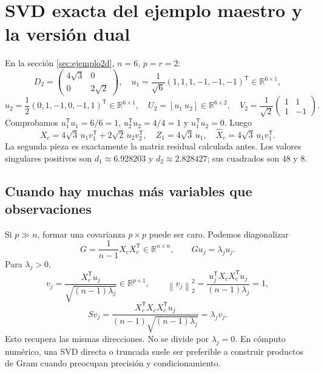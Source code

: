 \documentclass[11pt,a4paper]{article}
\newcommand{\R}{\mathbb R}
\newcommand{\T}{^{\mathsf T}}
\newcommand{\norm}[1]{\left\lVert #1\right\rVert}
\theoremstyle{definition}
\begin{document}
\section{SVD exacta del ejemplo maestro y la versión dual}
En la sección \ref{sec:ejemplo2d}, $n=6$, $p=r=2$:
\[
D_2=\begin{pmatrix}4\sqrt3&0\\0&2\sqrt2\end{pmatrix},\quad
u_1=\frac1{\sqrt6}(1,1,1,-1,-1,-1)\T\in\R^{6\times1},
\]
\[
u_2=\frac12(0,1,-1,0,-1,1)\T\in\R^{6\times1},\quad
U_2=[u_1\ u_2]\in\R^{6\times2},\quad
V_2=\frac1{\sqrt2}\begin{pmatrix}1&1\\1&-1\end{pmatrix}.
\]
Comprobamos $u_1\T u_1=6/6=1$, $u_2\T u_2=4/4=1$ y $u_1\T u_2=0$. Luego
\[
X_c=4\sqrt3\,u_1v_1\T+2\sqrt2\,u_2v_2\T,\quad
Z_1=4\sqrt3\,u_1,\quad \widehat X_c=4\sqrt3\,u_1v_1\T.
\]
La segunda pieza es exactamente la matriz residual calculada antes. Los valores singulares positivos son $d_1\approx6.928203$ y $d_2\approx2.828427$; sus cuadrados son $48$ y $8$.
\subsection{Cuando hay muchas más variables que observaciones}
Si $p\gg n$, formar una covarianza $p\times p$ puede ser caro. Podemos diagonalizar
\[
G=\frac1{n-1}X_cX_c\T\in\R^{n\times n},\qquad Gu_j=\lambda_ju_j.
\]
Para $\lambda_j>0$,
\[
v_j=\frac{X_c\T u_j}{\sqrt{(n-1)\lambda_j}}\in\R^{p\times1},\qquad
\norm{v_j}_2^2=\frac{u_j\T X_cX_c\T u_j}{(n-1)\lambda_j}=1,
\]
\[
Sv_j=\frac{X_c\T X_cX_c\T u_j}{(n-1)\sqrt{(n-1)\lambda_j}}=\lambda_jv_j.
\]
Esto recupera las mismas direcciones. No se divide por $\lambda_j=0$. En cómputo numérico, una SVD directa o truncada suele ser preferible a construir productos de Gram cuando preocupan precisión y condicionamiento.
\end{document}
